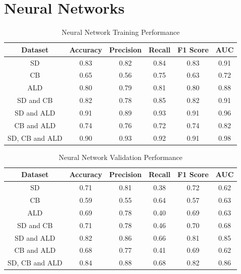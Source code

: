 \vspace{10pt}




\section{Neural Networks}

\vspace{10pt}

\begin{table}[H]
\begin{center}
\begin{tabular}{|c|c|c|c|c|c|} 
\hline
\multicolumn{1}{|c|}{Dataset}
&\multicolumn{1}{|c|}{Accuracy}
&\multicolumn{1}{|c|}{Precision}
&\multicolumn{1}{|c|}{Recall}
&\multicolumn{1}{|c|}{F1 Score}
&\multicolumn{1}{|c|}{AUC}\\
\hline
SD & 0.83 & 0.82 & 0.84 & 0.83 & 0.91    \\
\hline
CB & 0.65 & 0.56 & 0.75 & 0.63 & 0.72    \\
\hline
ALD & 0.80 & 0.79 & 0.81 & 0.80 & 0.88    \\
\hline
SD and CB & 0.82 & 0.78 & 0.85 & 0.82 & 0.91    \\
\hline
SD and ALD & 0.91 & 0.89 & 0.93 & 0.91 & 0.96    \\
\hline
CB and ALD & 0.74 & 0.76 & 0.72 & 0.74 & 0.82    \\
\hline
SD, CB and ALD & 0.90 & 0.93 & 0.92 & 0.91 & 0.98    \\
\hline
\end{tabular}
\end{center}
\caption{Neural Network Training Performance}
\label{table:NN training}
\end{table}

\vspace{10pt}

\begin{table}[H]
\begin{center}
\begin{tabular}{|c|c|c|c|c|c|} 
\hline
\multicolumn{1}{|c|}{Dataset}
&\multicolumn{1}{|c|}{Accuracy}
&\multicolumn{1}{|c|}{Precision}
&\multicolumn{1}{|c|}{Recall}
&\multicolumn{1}{|c|}{F1 Score}
&\multicolumn{1}{|c|}{AUC}\\
\hline
SD & 0.71 & 0.81 & 0.38 & 0.72 & 0.62    \\
\hline
CB & 0.59 & 0.55 & 0.64 & 0.57 & 0.63    \\
\hline
ALD & 0.69 & 0.78 & 0.40 & 0.69 & 0.63    \\
\hline
SD and CB & 0.71 & 0.78 & 0.46 & 0.70 & 0.68    \\
\hline
SD and ALD & 0.82 & 0.86 & 0.66 & 0.81 & 0.85    \\
\hline
CB and ALD & 0.68 & 0.77 & 0.41 & 0.69 & 0.62    \\
\hline
SD, CB and ALD & 0.84 & 0.88 & 0.68 & 0.82 & 0.86    \\
\hline
\end{tabular}
\end{center}
\caption{Neural Network Validation Performance}
\label{table:NN test}
\end{table}

\vspace{10pt}